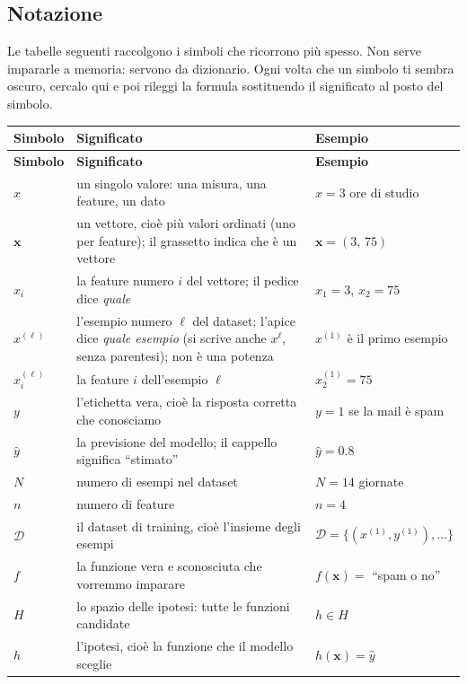 \documentclass[12pt]{extarticle}
\begin{document}
\subsection*{Notazione}

Le tabelle seguenti raccolgono i simboli che ricorrono più spesso. Non serve impararle a memoria: servono da dizionario. Ogni volta che un simbolo ti sembra oscuro, cercalo qui e poi rileggi la formula sostituendo il significato al posto del simbolo.

\begingroup
\footnotesize
\renewcommand{\arraystretch}{1.1}
\begin{longtable}[c]{@{}L{2.4cm}L{8.2cm}L{5.4cm}@{}}
\toprule
\textbf{Simbolo} & \textbf{Significato} & \textbf{Esempio} \\
\midrule
\endfirsthead
\toprule
\textbf{Simbolo} & \textbf{Significato} & \textbf{Esempio} \\
\midrule
\endhead
$x$ & un singolo valore: una misura, una feature, un dato & $x=3$ ore di studio \\
$\mathbf{x}$ & un vettore, cioè più valori ordinati (uno per feature); il grassetto indica che è un vettore & $\mathbf{x}=(3,\,75)$ \\
$x_i$ & la feature numero $i$ del vettore; il pedice dice \emph{quale} & $x_1=3$, $x_2=75$ \\
$x^{(\ell)}$ & l'esempio numero $\ell$ del dataset; l'apice dice \emph{quale esempio} (si scrive anche $x^\ell$, senza parentesi); non è una potenza & $x^{(1)}$ è il primo esempio \\
$x_i^{(\ell)}$ & la feature $i$ dell'esempio $\ell$ & $x_2^{(1)}=75$ \\
$y$ & l'etichetta vera, cioè la risposta corretta che conosciamo & $y=1$ se la mail è spam \\
$\hat{y}$ & la previsione del modello; il cappello significa ``stimato'' & $\hat{y}=0.8$ \\
$N$ & numero di esempi nel dataset & $N=14$ giornate \\
$n$ & numero di feature & $n=4$ \\
$\mathcal{D}$ & il dataset di training, cioè l'insieme degli esempi & $\mathcal{D}=\{(x^{(1)},y^{(1)}),\dots\}$ \\
$f$ & la funzione vera e sconosciuta che vorremmo imparare & $f(\mathbf{x})=$ ``spam o no'' \\
$H$ & lo spazio delle ipotesi: tutte le funzioni candidate & $h\in H$ \\
$h$ & l'ipotesi, cioè la funzione che il modello sceglie & $h(\mathbf{x})=\hat{y}$ \\

\end{longtable}
\end{document}

